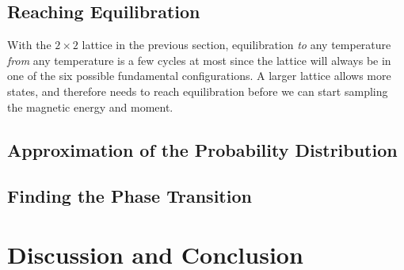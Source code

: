 \documentclass[]{article}
\begin{document}
\subsection{Reaching Equilibration} \label{sec:equilibration}

With the $2 \times 2$ lattice in the previous section, equilibration \textit{to} any temperature \textit{from} any temperature is a few cycles at most since the lattice will always be in one of the six possible fundamental configurations. A larger lattice allows more states, and therefore needs to reach equilibration before we can start sampling the magnetic energy and moment.




\subsection{Approximation of the Probability Distribution} \label{sec:equilibration}


\subsection{Finding the Phase Transition} \label{sec:equilibration}






\clearpage
\section{Discussion and Conclusion} \label{sec:conclusion}




\end{document}
